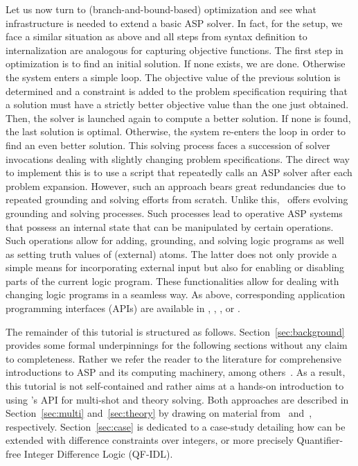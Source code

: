 Let us now turn to (branch-and-bound-based) optimization and see what infrastructure is needed to extend a basic ASP solver.
In fact, for the setup, we face a similar situation as above and all steps from syntax definition to internalization
are analogous for capturing objective functions.
The first step in optimization is to find an initial solution.
If none exists, we are done.
Otherwise the system enters a simple loop.
The objective value of the previous solution is determined
and a constraint is added to the problem specification requiring that
a solution must have a strictly better objective value than the one just obtained.
Then, the solver is launched again to compute a better solution.
If none is found, the last solution is optimal.
Otherwise, the system re-enters the loop in order to find an even better solution.
This solving process faces a succession of solver invocations dealing with slightly changing problem specifications.
The direct way to implement this is to use a script that repeatedly calls an ASP solver after each problem expansion.
However, such an approach bears great redundancies due to repeated grounding and solving efforts from scratch.
%
Unlike this,
\clingo\ offers evolving grounding and solving processes.
Such processes lead to operative ASP systems that possess an internal state that can be manipulated by certain operations.
Such operations allow for adding, grounding, and solving logic programs as well as
setting truth values of (external) atoms.
The latter does not only provide a simple means for incorporating external input but
also for enabling or disabling parts of the current logic program.
These functionalities allow for dealing with changing logic programs in a seamless way.
As above, corresponding application programming interfaces (APIs) are available in \C, \cpp, \lua, or \python.

The remainder of this tutorial is structured as follows.
Section~\ref{sec:background} provides some formal underpinnings for the following sections
without any claim to completeness.
Rather we refer the reader to the literature for comprehensive introductions to ASP and its computing machinery,
among others~\cite{baral02a,lifschitz04a,eiiakr09a,gekakasc12a,gelkah14a}.
As a result,
this tutorial is not self-contained and rather aims at a hands-on introduction to using \clingo's API
for multi-shot and theory solving.
Both approaches are described in Section~\ref{sec:multi} and~\ref{sec:theory} by drawing on material from~\cite{gekakasc14b,gekaobsc15a}
and~\cite{gekakaosscwa16a}, respectively.
Section~\ref{sec:case} is dedicated to a case-study detailing how \clingo{} can be extended with difference constraints over integers,
or more precisely Quantifier-free Integer Difference Logic (QF-IDL).


